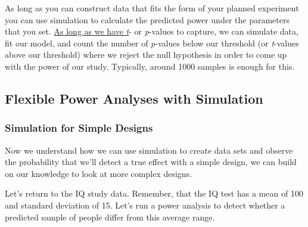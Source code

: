 \documentclass[
]{book}
\newenvironment{Shaded}{\begin{snugshade}}{\end{snugshade}}
\newcommand{\AttributeTok}[1]{\textcolor[rgb]{0.77,0.63,0.00}{#1}}
\newcommand{\ControlFlowTok}[1]{\textcolor[rgb]{0.13,0.29,0.53}{\textbf{#1}}}
\newcommand{\FunctionTok}[1]{\textcolor[rgb]{0.00,0.00,0.00}{#1}}
\newcommand{\NormalTok}[1]{#1}
\newcommand{\OtherTok}[1]{\textcolor[rgb]{0.56,0.35,0.01}{#1}}
\newcommand{\SpecialCharTok}[1]{\textcolor[rgb]{0.00,0.00,0.00}{#1}}
\begin{document}
As long as you can construct data that fits the form of your planned experiment you can use simulation to calculate the predicted power under the parameters that you set. \href{https://youtu.be/avHLWnX2ehQ}{As long as we have \emph{t}}- or \emph{p}-values to capture, we can simulate data, fit our model, and count the number of \emph{p}-values below our threshold (or \emph{t}-values above our threshold) where we reject the null hypothesis in order to come up with the power of our study. Typically, around 1000 samples is enough for this.

\hypertarget{flexible-power-analyses-with-simulation}{%
\subsection{Flexible Power Analyses with Simulation}\label{flexible-power-analyses-with-simulation}}

\hypertarget{simulation-for-simple-designs}{%
\subsubsection{Simulation for Simple Designs}\label{simulation-for-simple-designs}}

Now we understand how we can use simulation to create data sets and observe the probability that we'll detect a true effect with a simple design, we can build on our knowledge to look at more complex designs.

Let's return to the IQ study data. Remember, that the IQ test has a mean of 100 and standard deviation of 15. Let's run a power analysis to detect whether a predicted sample of people differ from this average range.

\begin{Shaded}
\end{Shaded}
\end{document}
